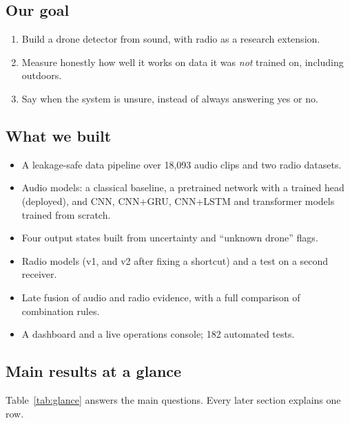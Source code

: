 \documentclass[conference,a4paper]{IEEEtran}
\begin{document}
\subsection{Our goal}
\begin{enumerate}
  \item Build a drone detector from sound, with radio as a research extension.
  \item Measure honestly how well it works on data it was \emph{not} trained on, including outdoors.
  \item Say when the system is unsure, instead of always answering yes or no.
\end{enumerate}

\subsection{What we built}
\begin{itemize}
  \item A leakage-safe data pipeline over 18,093 audio clips and two radio datasets.
  \item Audio models: a classical baseline, a pretrained network with a trained head (deployed),
        and CNN, CNN+GRU, CNN+LSTM and transformer models trained from scratch.
  \item Four output states built from uncertainty and ``unknown drone'' flags.
  \item Radio models (v1, and v2 after fixing a shortcut) and a test on a second receiver.
  \item Late fusion of audio and radio evidence, with a full comparison of combination rules.
  \item A dashboard and a live operations console; 182 automated tests.
\end{itemize}

\subsection{Main results at a glance}
Table~\ref{tab:glance} answers the main questions. Every later section explains one row.
\end{document}
